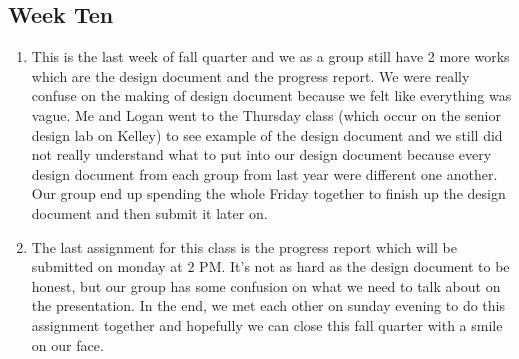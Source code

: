 \begin{singlespace}
\subsection{Week Ten}
\begin{enumerate}
    \item This is the last week of fall quarter and we as a group still have 2 more works which are the design document and the progress report. We were really confuse on the making of design document because we felt like everything was vague. Me and Logan went to the Thursday class (which occur on the senior design lab on Kelley) to see example of the design document and we still did not really understand what to put into our design document because every design document from each group from last year were different one another. Our group end up spending the whole Friday together to finish up the design document and then submit it later on. 
    \item The last assignment for this class is the progress report which will be submitted on monday at 2 PM. It's not as hard as the design document to be honest, but our group has some confusion on what we need to talk about on the presentation. In the end, we met each other on sunday evening to do this assignment together and hopefully we can close this fall quarter with a smile on our face. 
\end{enumerate}






\end{singlespace}

